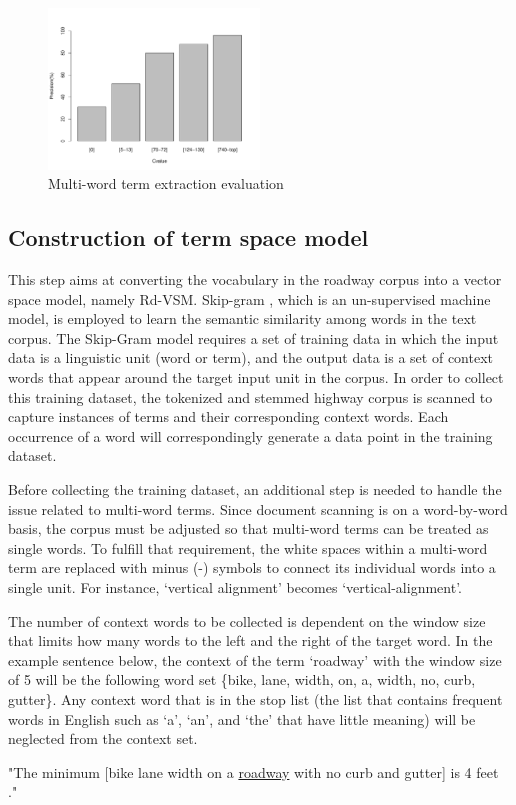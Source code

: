 \documentclass[Journal, BackFigs,NoLists, DoubleSpace]{ascelike}%
\begin{document}
\begin{figure}[t]
	\centering
	\includegraphics[width=0.5\textwidth]{Figure3_term_precision}
	\caption{Multi-word term extraction evaluation}
	\label{fig:term_precision}
\end{figure}
%
\subsection{Construction of term space model}
%
This step aims at converting the vocabulary in the roadway corpus into a vector space model, namely Rd-VSM. Skip-gram \cite{mikolov13a}, which is an un-supervised machine model, is employed to learn the semantic similarity among words in the text corpus. The Skip-Gram model requires a set of training data in which the input data is a linguistic unit (word or term), and the output data is a set of context words that appear around the target input unit in the corpus. In order to collect this training dataset, the tokenized and stemmed highway corpus is scanned to capture instances of terms and their corresponding context words. Each occurrence of a word will correspondingly generate a data point in the training dataset.
\par
Before collecting the training dataset, an additional step is needed to handle the issue related to multi-word terms. Since document scanning is on a word-by-word basis, the corpus must be adjusted so that multi-word terms can be treated as single words. To fulfill that requirement, the white spaces within a multi-word term are replaced with minus (-) symbols to connect its individual words into a single unit. For instance, `vertical alignment' becomes `vertical-alignment'.
\par
The number of context words to be collected is dependent on the window size that limits how many words to the left and the right of the target word. In the example sentence below, the context of the term `roadway' with the window size of 5 will be the following word set \{bike, lane, width, on, a, width, no, curb, gutter\}. Any context word that is in the stop list (the list that contains frequent words in English such as `a', `an', and `the' that have little meaning) will be neglected from the context set.
%
\begin{center}
	"The minimum [bike lane width on a \underline{roadway} with no curb and gutter] is 4 feet ."
\end{center}
\end{document}
